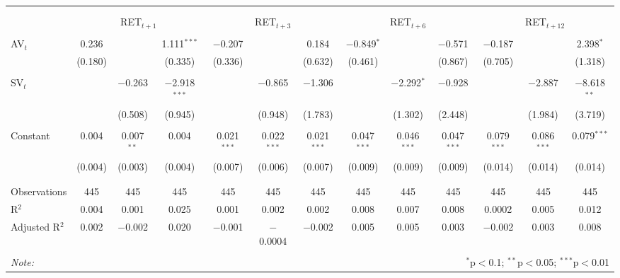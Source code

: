 
\begin{tabular}{@{\extracolsep{5pt}}lcccccccccccc} 
\\[-1.8ex]\hline 
\hline \\[-1.8ex] 
\\[-1.8ex] & \multicolumn{3}{c}{RET$_{t+1}$} & \multicolumn{3}{c}{RET$_{t+3}$} & \multicolumn{3}{c}{RET$_{t+6}$} & \multicolumn{3}{c}{RET$_{t+12}$} \\ 
\hline \\[-1.8ex] 
 AV$_{t}$ & 0.236 &  & 1.111$^{***}$ & $-$0.207 &  & 0.184 & $-$0.849$^{*}$ &  & $-$0.571 & $-$0.187 &  & 2.398$^{*}$ \\ 
  & (0.180) &  & (0.335) & (0.336) &  & (0.632) & (0.461) &  & (0.867) & (0.705) &  & (1.318) \\ 
  & & & & & & & & & & & & \\ 
 SV$_{t}$ &  & $-$0.263 & $-$2.918$^{***}$ &  & $-$0.865 & $-$1.306 &  & $-$2.292$^{*}$ & $-$0.928 &  & $-$2.887 & $-$8.618$^{**}$ \\ 
  &  & (0.508) & (0.945) &  & (0.948) & (1.783) &  & (1.302) & (2.448) &  & (1.984) & (3.719) \\ 
  & & & & & & & & & & & & \\ 
 Constant & 0.004 & 0.007$^{**}$ & 0.004 & 0.021$^{***}$ & 0.022$^{***}$ & 0.021$^{***}$ & 0.047$^{***}$ & 0.046$^{***}$ & 0.047$^{***}$ & 0.079$^{***}$ & 0.086$^{***}$ & 0.079$^{***}$ \\ 
  & (0.004) & (0.003) & (0.004) & (0.007) & (0.006) & (0.007) & (0.009) & (0.009) & (0.009) & (0.014) & (0.014) & (0.014) \\ 
  & & & & & & & & & & & & \\ 
\hline \\[-1.8ex] 
Observations & 445 & 445 & 445 & 445 & 445 & 445 & 445 & 445 & 445 & 445 & 445 & 445 \\ 
R$^{2}$ & 0.004 & 0.001 & 0.025 & 0.001 & 0.002 & 0.002 & 0.008 & 0.007 & 0.008 & 0.0002 & 0.005 & 0.012 \\ 
Adjusted R$^{2}$ & 0.002 & $-$0.002 & 0.020 & $-$0.001 & $-$0.0004 & $-$0.002 & 0.005 & 0.005 & 0.003 & $-$0.002 & 0.003 & 0.008 \\ 
\hline 
\hline \\[-1.8ex] 
\textit{Note:}  & \multicolumn{12}{r}{$^{*}$p$<$0.1; $^{**}$p$<$0.05; $^{***}$p$<$0.01} \\ 
\end{tabular} 
